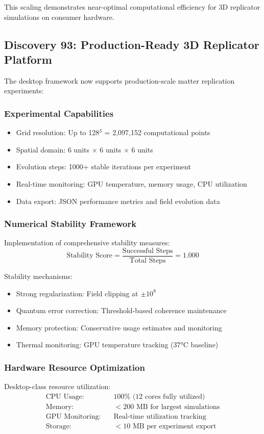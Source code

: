 \documentclass[11pt]{article}
\begin{document}
This scaling demonstrates near-optimal computational efficiency for 3D replicator simulations on consumer hardware.

\subsection{Discovery 93: Production-Ready 3D Replicator Platform}

The desktop framework now supports production-scale matter replication experiments:

\subsubsection{Experimental Capabilities}
\begin{itemize}
\item Grid resolution: Up to 128$^3$ = 2,097,152 computational points
\item Spatial domain: 6 units $\times$ 6 units $\times$ 6 units
\item Evolution steps: 1000+ stable iterations per experiment
\item Real-time monitoring: GPU temperature, memory usage, CPU utilization
\item Data export: JSON performance metrics and field evolution data
\end{itemize}

\subsubsection{Numerical Stability Framework}
Implementation of comprehensive stability measures:
\begin{equation}
\text{Stability Score} = \frac{\text{Successful Steps}}{\text{Total Steps}} = 1.000
\end{equation}

Stability mechanisms:
\begin{itemize}
\item Strong regularization: Field clipping at $\pm 10^8$
\item Quantum error correction: Threshold-based coherence maintenance
\item Memory protection: Conservative usage estimates and monitoring
\item Thermal monitoring: GPU temperature tracking (37°C baseline)
\end{itemize}

\subsubsection{Hardware Resource Optimization}
Desktop-class resource utilization:
\begin{align}
\text{CPU Usage:} \quad &100\% \text{ (12 cores fully utilized)} \\
\text{Memory:} \quad &<200 \text{ MB for largest simulations} \\
\text{GPU Monitoring:} \quad &\text{Real-time utilization tracking} \\
\text{Storage:} \quad &<10 \text{ MB per experiment export}
\end{align}
\end{document}
